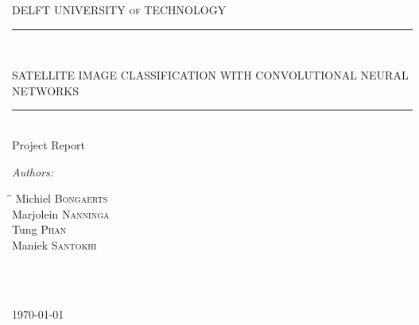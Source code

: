 \documentclass[a4paper,onecolumn]{report}
\begin{document}

\begin{titlepage}


\newcommand{\HRule}{\rule{\linewidth}{0.5mm}}
\newcommand{\horrule}[1]{\rule{\linewidth}{#1}}

\center %

\textsc{\small DELFT UNIVERSITY of TECHNOLOGY}\\[2.5cm] %

\HRule \\[0.1cm]
\begin{spacing}{1.6}
{ \huge SATELLITE IMAGE CLASSIFICATION WITH CONVOLUTIONAL NEURAL NETWORKS}\\[-0.4cm] %
\end{spacing}
\HRule \\[1.0cm]
\LARGE Project Report\\[1.5cm]

\begin{minipage}{0.4\textwidth}

\begin{flushleft} \large
\emph{Authors:}\\
\begin{tabbing}
\hspace*{4cm}\=\hspace*{3cm}\= \kill
Michiel \textsc{Bongaerts}   \\
Marjolein \textsc{Nanninga}  \\
Tung \textsc{Phan}  \\
Maniek \textsc{Santokhi}  
\end{tabbing}
\end{flushleft}

\end{minipage}
~
\begin{minipage}{0.4\textwidth}
\begin{flushright} \large
\end{flushright}
\end{minipage}\\[4cm]

{\large \today}\\[3cm]

\restoregeometry

\vfill

\end{titlepage}
\end{document}
